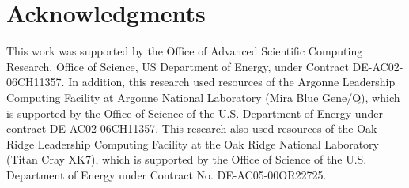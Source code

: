 \section*{Acknowledgments}

This work was supported by the Office of Advanced Scientific Computing Research,
Office of Science, US Department of Energy, under Contract DE-AC02-06CH11357. In
addition, this research used resources of the Argonne Leadership Computing
Facility at Argonne National Laboratory (Mira Blue Gene/Q), which is supported
by the Office of Science of the U.S. Department of Energy under contract
DE-AC02-06CH11357. This research also used resources of the Oak Ridge Leadership
Computing Facility at the Oak Ridge National Laboratory (Titan Cray XK7), which
is supported by the Office of Science of the U.S. Department of Energy under
Contract No. DE-AC05-00OR22725.